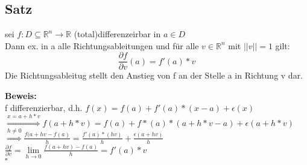 \subsection{Satz}
sei $f: D\subseteq \mathbb{R}^n\rightarrow \mathbb{R}$ (total)differenzeirbar in $a\in D$\\
Dann ex. in a alle Richtungsableitungen und für alle $v\in\mathbb{R}^n$ mit $||v||=1$ gilt:
\[\frac{\partial f}{\partial v}(a)=f'(a)*v\]
Die Richtungsableitug stellt den Anstieg von f an der Stelle a in Richtung v dar.

\textbf{Beweis:}\\
f differenzierbar, d.h. $f(x)=f(a)+f'(a)*(x-a)+\epsilon(x)$\\
$\stackrel{x=a+h*v}{\Rightarrow} f(a+h*v)=f(a)+f*(a)*(a+h*v-a)+\epsilon(a+h*v)$\\
$\stackrel{h\neq 0}{\Rightarrow} \frac{f(a+hv-f(a)}{h}=\frac{f'(a)*(hv)}{h} + \frac{\epsilon (a+hv)}{h}$\\
$\frac{\partial f}{\partial v}=\lim\limits_{h\rightarrow 0}\frac{f(a+hv)-f(a)}{h}=f'(a)*v$\\
\hspace*{13cm}$\square$

